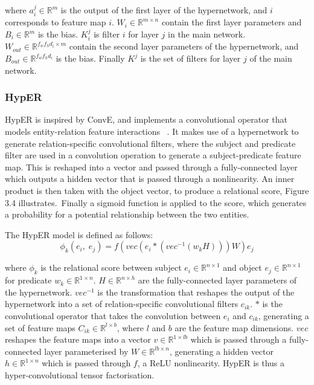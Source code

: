 \noindent where $ a_i^j \in \mathbb{R}^{m} $ is the output of the first layer of the hypernetwork, and $ i $ corresponds to feature map $ i $. $ W_i \in \mathbb{R}^{m \times n} $ contain the first layer parameters and $ B_i \in \mathbb{R}^m $ is the bias. $ K_i^j $ is filter $ i $ for layer $ j $ in the main network. $ W_{out} \in \mathbb{R}^{f_w f_hd_i \times m} $ contain the second layer parameters of the hypernetwork, and $ B_{out} \in \mathbb{R}^{f_wf_hd_i} $ is the bias. Finally $ K^j $ is the set of filters for layer $ j $ of the main network. \par

\subsubsection{HypER}

\noindent HypER is inspired by ConvE, and implements a convolutional operator that models entity-relation feature interactions \unskip ~\citep{balazevic2019hypernetwork}. It makes use of a hypernetwork to generate relation-specific convolutional filters, where the subject and predicate filter are used in a convolution operation to generate a subject-predicate feature map. This is reshaped into a vector and passed through a fully-connected layer which outputs a hidden vector that is passed through a nonlinearity. An inner product is then taken with the object vector, to produce a relational score, Figure 3.4 illustrates.\ Finally a sigmoid function is applied to the score, which generates a probability for a potential relationship between the two entities. \par

\noindent The HypER model is defined as follows: 
\begin{equation}
	\phi_k(e_i, \; e_j) = f(vec(e_i * (vec^{-1}(w_kH)))W)e_j
\end{equation}

\noindent where $ \phi_k $ is the relational score between subject $ e_i \in \mathbb{R}^{n \times 1} $ and object $ e_j \in \mathbb{R}^{n \times 1} $ for predicate $ w_k \in \mathbb{R}^{1 \times n} $. $ H \in \mathbb{R}^{n \times h} $ are the fully-connected layer parameters of the hypernetwork. $ vec^{-1} $ is the transformation that reshapes the output of the hypernetwork into a set of relation-specific convolutional filters $ c_{ik} $. $ * $ is the convolutional operator that takes the convolution between $ e_i $ and $ c_{ik} $, generating a set of feature maps $ C_{ik} \in \mathbb{R}^{l \times b} $, where $ l $ and $ b $ are the feature map dimensions. $ vec $ reshapes the feature maps into a vector $ v \in \mathbb{R}^{1 \times lb} $ which is passed through a fully-connected layer parameterised by $ W \in \mathbb{R}^{lb \times n} $, generating a hidden vector $ h \in \mathbb{R}^{1 \times n} $ which is passed through $ f $, a ReLU nonlinearity. HypER is thus a hyper-convolutional tensor factorisation. 

